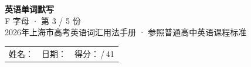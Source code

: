 \documentclass[10pt,a4paper]{article}
\begin{document}
\pagestyle{plain}

\begin{center}
{\LARGE\bfseries 英语单词默写}\\[0.22em]
{\large F 字母 · 第 3 / 5 份}\\[0.18em]
{\small 2026年上海市高考英语词汇用法手册 · 参照普通高中英语课程标准}
\end{center}

\vspace{0.25em}
\noindent\begin{tabular}{@{}p{}@{}p{}@{}p{}@{}}
姓名：\underline{\hspace{2.0cm}} & 日期：\underline{\hspace{2.0cm}} & 得分：\underline{\hspace{1.3cm}}\,/\,41 \\
\end{tabular}

\vspace{0.3em}

\vspace{0.08em}
\end{document}
